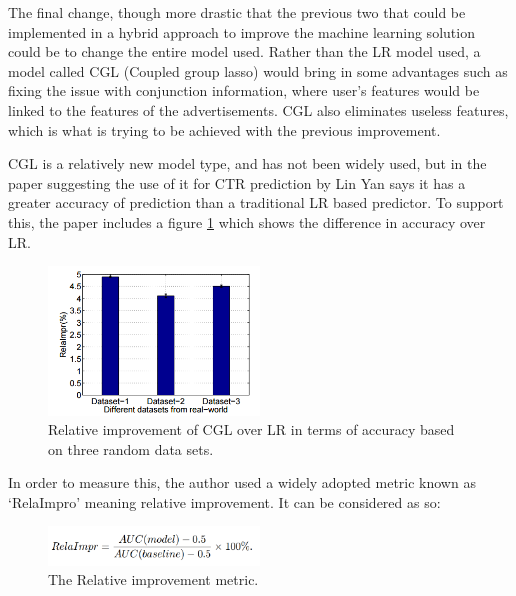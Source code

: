\documentclass[journal]{IEEEtran}
\begin{document}
The final change, though more drastic that the previous two that could be implemented in a hybrid approach to improve the machine learning solution could be to change the entire model used. Rather than the LR model used, a model called CGL (Coupled group lasso) would bring in some advantages such as fixing the issue with conjunction information, where user's features would be linked to the features of the advertisements. CGL also eliminates useless features, which is what is trying to be achieved with the previous improvement.\par
CGL is a relatively new model type, and has not been widely used, but in the paper suggesting the use of it for CTR prediction by Lin Yan \cite{lasso} says it has a greater accuracy of prediction than a traditional LR based predictor. To support this, the paper includes a figure \ref{fig:improvement} which shows the difference in accuracy over LR.  
\begin{figure}[H]
  \caption{Relative improvement of CGL over LR in terms of accuracy based on three random data sets.}
  \centering
  \label{fig:improvement}
    \includegraphics[width=0.5\textwidth]{graph}
\end{figure}
\par
In order to measure this, the author used a widely adopted metric known as ‘RelaImpro' meaning relative improvement. It can be considered as so:
\begin{figure}[!ht]
  \caption{The Relative improvement metric.}
  \centering
  \label{fig:relaimpro}
    \includegraphics[width=0.5\textwidth]{relaimpro}
\end{figure}
\end{document}
